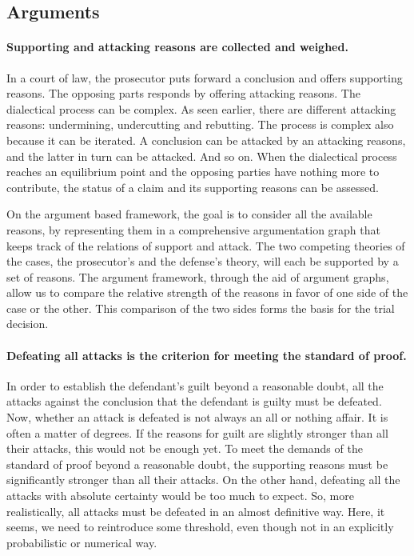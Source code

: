 \documentclass[10pt]{article}
\begin{document}
\subsection{Arguments}


\paragraph{Supporting and attacking reasons are collected and weighed.}

In a court of law, the prosecutor puts forward a conclusion and offers supporting reasons. The opposing parts responds by offering attacking reasons. 
The dialectical process can be complex. As seen earlier, there are different attacking reasons: undermining,  undercutting and rebutting. The process is complex also because 
it can be iterated. A conclusion can be attacked by an attacking reasons, and the latter in turn can be attacked. And so on. 
When the dialectical process reaches an equilibrium point and the opposing parties have nothing more to contribute, 
the status of a claim and its supporting reasons can be assessed. 

On the argument based framework, the goal is to consider all the available reasons, by representing them in a comprehensive argumentation graph that 
keeps track of the relations of support and attack. The two competing theories of the cases, the prosecutor's and the defense's theory, will each
be supported by a set of reasons. The argument framework, through the aid of argument graphs, allow us to 
compare the relative strength of the reasons in favor of one side of the case or the other. This comparison of the two sides 
forms the basis for the trial decision.


\paragraph{Defeating all attacks is the criterion for meeting the standard of proof.}

In order to establish the defendant's guilt beyond a reasonable doubt, 
all the attacks against the conclusion that the defendant is guilty must be 
defeated. Now, whether an attack is defeated 
is not always an all or nothing affair. It is often a matter of degrees. 
If the reasons for guilt are slightly stronger than all their attacks, this would not be enough yet. 
To meet the demands of the standard of proof beyond a reasonable doubt, the supporting reasons must be significantly 
stronger than all their attacks. On the other hand, defeating all the attacks with absolute certainty would be too much to expect. 
So, more realistically, all attacks must be defeated in an almost definitive way. Here, it seems, we need 
to reintroduce some threshold, even though not in an explicitly probabilistic or numerical way. 
\end{document}
